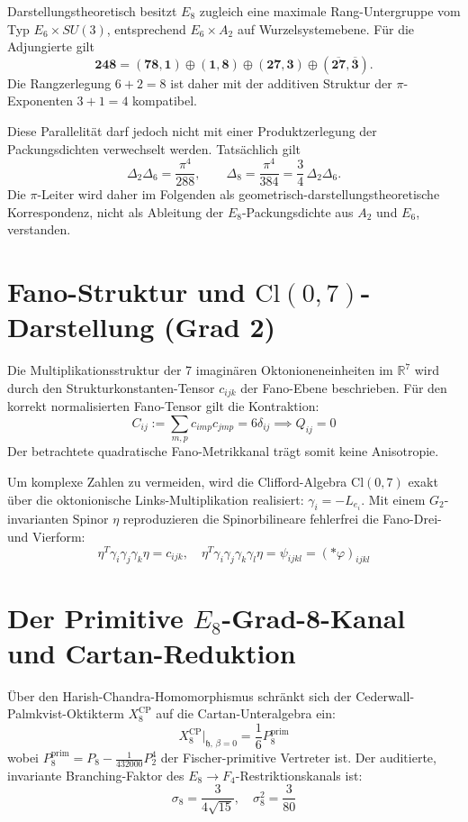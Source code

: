 \documentclass[11pt,a4paper]{article}
\begin{document}
Darstellungstheoretisch besitzt $E_8$ zugleich eine maximale Rang-Untergruppe vom Typ $E_6\times SU(3)$, entsprechend $E_6\times A_2$ auf Wurzelsystemebene. Für die Adjungierte gilt
\[
\mathbf{248}=(\mathbf{78},\mathbf{1})\oplus(\mathbf{1},\mathbf{8})\oplus(\mathbf{27},\mathbf{3})
\oplus(\overline{\mathbf{27}},\overline{\mathbf{3}}).
\]
Die Rangzerlegung $6+2=8$ ist daher mit der additiven Struktur der $\pi$-Exponenten $3+1=4$ kompatibel.

Diese Parallelität darf jedoch nicht mit einer Produktzerlegung der Packungsdichten verwechselt werden. Tatsächlich gilt
\[
\Delta_2\Delta_6=\frac{\pi^4}{288},
\qquad
\Delta_8=\frac{\pi^4}{384}
=\frac{3}{4}\,\Delta_2\Delta_6.
\]
Die $\pi$-Leiter wird daher im Folgenden als geometrisch-darstellungstheoretische Korrespondenz, nicht als Ableitung der $E_8$-Packungsdichte aus $A_2$ und $E_6$, verstanden.

\section{Fano-Struktur und $\text{Cl}(0,7)$-Darstellung (Grad 2)}
Die Multiplikationsstruktur der 7 imaginären Oktonioneneinheiten im $\mathbb{R}^7$ wird durch den Strukturkonstanten-Tensor $c_{ijk}$ der Fano-Ebene beschrieben. Für den korrekt normalisierten Fano-Tensor gilt die Kontraktion:
$$C_{ij} := \sum_{m,p} c_{imp} c_{jmp} = 6\delta_{ij} \implies Q_{ij} = 0$$
Der betrachtete quadratische Fano-Metrikkanal trägt somit keine Anisotropie.

Um komplexe Zahlen zu vermeiden, wird die Clifford-Algebra $\text{Cl}(0,7)$ exakt über die oktonionische Links-Multiplikation realisiert: $\gamma_i = -L_{e_i}$. Mit einem $G_2$-invarianten Spinor $\eta$ reproduzieren die Spinorbilineare fehlerfrei die Fano-Drei- und Vierform:
$$\eta^T \gamma_i \gamma_j \gamma_k \eta = c_{ijk}, \quad \eta^T \gamma_i \gamma_j \gamma_k \gamma_l \eta = \psi_{ijkl} = (*\varphi)_{ijkl}$$

\section{Der Primitive $E_8$-Grad-8-Kanal und Cartan-Reduktion}
Über den Harish-Chandra-Homomorphismus schränkt sich der Cederwall-Palmkvist-Oktikterm $X_8^{\text{CP}}$ auf die Cartan-Unteralgebra ein:
$$X_8^{\text{CP}}\big|_{\mathfrak{h}, \, \beta=0} = \frac{1}{6} P_8^{\text{prim}}$$
wobei $P_8^{\text{prim}} = P_8 - \frac{1}{432000} P_2^4$ der Fischer-primitive Vertreter ist. Der auditierte, invariante Branching-Faktor des $E_8 \to F_4$-Restriktionskanals ist:
$$\sigma_8 = \frac{3}{4\sqrt{15}}, \quad \sigma_8^2 = \frac{3}{80}$$
\end{document}
